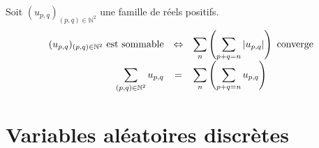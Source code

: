 \documentclass[11pt,a4paper,fleqn,pdftex]{report}
\begin{document}
\begin{itheorem}
     Soit $(u_{p,q})_{(p,q)\in \mathbb{N}^2}$ une famille de réels positifs.\newline
     \begin{equation}
          \begin{array}{r c l}
               (u_{p,q})_{(p,q)\in \mathbb{N}^2} \text{ est sommable} & \Leftrightarrow & \displaystyle\sum_n \left( \displaystyle\sum_{p+q = n} |u_{p,q}| \right)\text{ converge} \\
               \displaystyle\sum_{(p,q)\in \mathbb{N}^2} u_{p,q} & = & \displaystyle\sum_n \left( \displaystyle\sum_{p+q = n} u_{p,q} \right) \\
          \end{array}
     \end{equation}
\end{itheorem}
\chapter{Variables aléatoires discrètes} %
\label{cha:variables_aleatoires_discretes}
\end{document}
